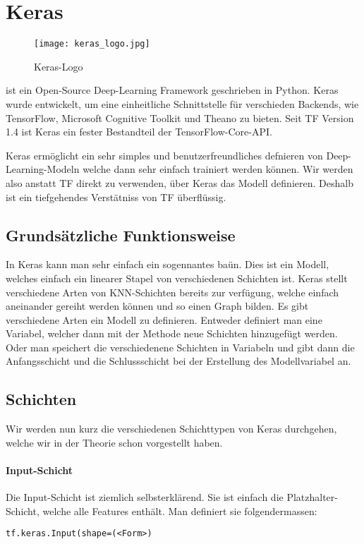 \pagebreak
\section{Keras}
\begin{wrapfigure}{l}{3cm}
  \texttt{[image: keras\_logo.jpg]}
  \caption{Keras-Logo}
\end{wrapfigure}
 ist ein Open-Source Deep-Learning Framework geschrieben in
Python. Keras wurde entwickelt, um eine einheitliche Schnittstelle für
verschieden Backends, wie TensorFlow, Microsoft Cognitive Toolkit und Theano zu
bieten. Seit TF Version 1.4 ist Keras ein fester Bestandteil der TensorFlow-Core-API.

Keras ermöglicht ein sehr simples und benutzerfreundliches defnieren von
Deep-Learning-Modeln welche dann sehr einfach trainiert werden können.
Wir werden also anstatt TF direkt zu verwenden, über Keras das Modell definieren.
Deshalb ist ein tiefgehendes Verstätniss von TF überflüssig.

\subsection{Grundsätzliche Funktionsweise}
In Keras kann man sehr einfach ein sogennantes  baün.
Dies ist ein Modell, welches einfach ein linearer Stapel von verschiedenen
Schichten ist. Keras stellt verschiedene Arten von KNN-Schichten bereits zur
verfügung, welche einfach aneinander gereiht werden können und so einen Graph bilden.
\para{}
Es gibt verschiedene Arten ein Modell zu definieren. Entweder definiert man eine
 Variabel, welcher dann mit der Methode 
neue Schichten hinzugefügt werden.
Oder man speichert die verschiedenene Schichten in Variabeln und gibt dann die
Anfangsschicht und die Schlussschicht bei der Erstellung des Modellvariabel an.

\subsection{Schichten}
Wir werden nun kurz die verschiedenen Schichttypen von Keras durchgehen, welche wir in
der Theorie schon vorgestellt haben.

\paragraph{Input-Schicht}
Die Input-Schicht ist ziemlich selbsterklärend. Sie ist einfach die
Platzhalter-Schicht, welche alle Features enthält.
Man definiert sie folgendermassen:
\begin{verbatim}
tf.keras.Input(shape=(<Form>)
\end{verbatim}

